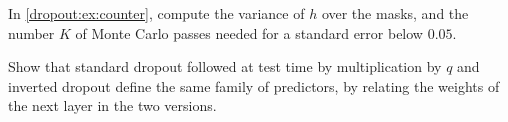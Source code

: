 \begin{notechapter}
\begin{exercise}\label{dropout:exr:4}
In \cref{dropout:ex:counter}, compute the variance of $h$ over the masks, and the number $K$ of Monte
Carlo passes needed for a standard error below $0.05$.
\end{exercise}

\begin{exercise}\label{dropout:exr:5}
Show that standard dropout followed at test time by multiplication by $q$ and inverted
dropout define the same family of predictors, by relating the weights of the next layer
in the two versions.
\end{exercise}
\end{notechapter}
